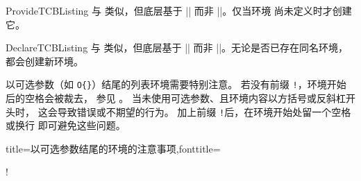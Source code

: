 \begin{docCommand}{ProvideTCBListing}{}
  与  类似，但底层基于 |\ProvideDocumentEnvironment|
  而非 |\NewDocumentEnvironment|。仅当环境  尚未定义时才创建它。
\end{docCommand}

\begin{docCommand}{DeclareTCBListing}{}
  与  类似，但底层基于 |\DeclareDocumentEnvironment|
  而非 |\NewDocumentEnvironment|。无论是否已存在同名环境，都会创建新环境。
\end{docCommand}

\clearpage

\begin{marker}
以可选参数（如 \verb+O{}+）结尾的列表环境需要特别注意。
若没有前缀 \flqq\verb+!+\frqq{}，环境开始后的空格会被裁去，
参见 \cite{latexproject:usrguide}。
当未使用可选参数、且环境内容以方括号或反斜杠开头时，
这会导致错误或不期望的行为。
加上前缀 \flqq\verb+!+\frqq 后，在环境开始处留一个空格或换行
即可避免这些问题。
\end{marker}

\begin{dispListing*}{title={以可选参数结尾的环境的注意事项},fonttitle=\bfseries}

\begin{mybox}[colframe=red]
\good
\end{mybox}

\begin{mybox}[colframe=red]\good\end{mybox}

\begin{mybox}
\good
\end{mybox}

\begin{mybox} \good\end{mybox}

\begin{mybox}\bad!\end{mybox}

\begin{mybox}
[\good]
\end{mybox}

\begin{mybox} [\good]\end{mybox}

\begin{mybox}[\bad!]\end{mybox}
\end{dispListing*}


